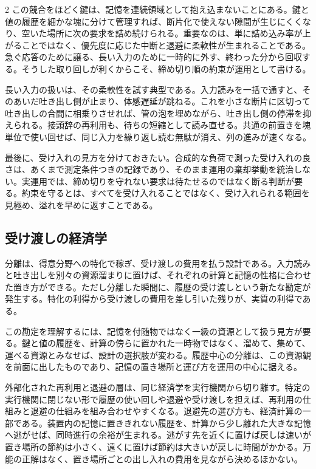 \documentclass[lualatex,a4paper,10pt]{jlreq}
\begin{document}
\begin{multicols}{2}
この競合をほどく鍵は、記憶を連続領域として抱え込まないことにある。鍵と値の履歴を細かな塊に分けて管理すれば、断片化で使えない隙間が生じにくくなり、空いた場所に次の要求を詰め続けられる\autocite{pagedattn}。重要なのは、単に詰め込み率が上がることではなく、優先度に応じた中断と退避に柔軟性が生まれることである。急ぐ応答のために譲る、長い入力のために一時的に外す、終わった分から回収する。そうした取り回しが利くからこそ、締め切り順の約束が運用として書ける。

長い入力の扱いは、その柔軟性を試す典型である。入力読みを一括で通すと、そのあいだ吐き出し側が止まり、体感遅延が跳ねる。これを小さな断片に区切って吐き出しの合間に相乗りさせれば、管の泡を埋めながら、吐き出し側の停滞を抑えられる\autocite{sarathi}。接頭辞の再利用も、待ちの短縮として読み直せる。共通の前置きを塊単位で使い回せば、同じ入力を繰り返し読む無駄が消え、列の進みが速くなる\autocite{sglang}\autocite{vllmprefix}\autocite{lmcache}。

最後に、受け入れの見方を分けておきたい。合成的な負荷で測った受け入れの良さは、あくまで測定条件つきの記録であり、そのまま運用の棄却挙動を統治しない。実運用では、締め切りを守れない要求は待たせるのではなく断る判断が要る。約束を守るとは、すべてを受け入れることではなく、受け入れられる範囲を見極め、溢れを早めに返すことである。

\subsection{受け渡しの経済学}
分離は、得意分野への特化で稼ぎ、受け渡しの費用を払う設計である。入力読みと吐き出しを別々の資源溜まりに置けば、それぞれの計算と記憶の性格に合わせた置き方ができる。ただし分離した瞬間に、履歴の受け渡しという新たな勘定が発生する。特化の利得から受け渡しの費用を差し引いた残りが、実質の利得である\autocite{splitwise}。

この勘定を理解するには、記憶を付随物ではなく一級の資源として扱う見方が要る。鍵と値の履歴を、計算の傍らに置かれた一時物ではなく、溜めて、集めて、運べる資源とみなせば、設計の選択肢が変わる。履歴中心の分離は、この資源観を前面に出したものであり、記憶の置き場所と運び方を運用の中心に据える\autocite{mooncake}。

外部化された再利用と退避の層は、同じ経済学を実行機関から切り離す。特定の実行機関に閉じない形で履歴の使い回しや退避や受け渡しを担えば、再利用の仕組みと退避の仕組みを組み合わせやすくなる\autocite{lmcache}。退避先の選び方も、経済計算の一部である。装置内の記憶に置ききれない履歴を、計算から少し離れた大きな記憶へ逃がせば、同時進行の余裕が生まれる。逃がす先を近くに置けば戻しは速いが置き場所の節約は小さく、遠くに置けば節約は大きいが戻しに時間がかかる。万能の正解はなく、置き場所ごとの出し入れの費用を見ながら決めるほかない。


\end{multicols}
\end{document}
